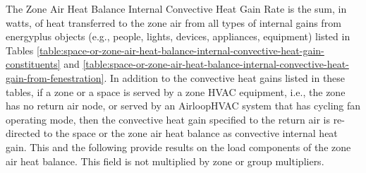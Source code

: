 The Zone Air Heat Balance Internal Convective Heat Gain Rate is the sum, in watts, of heat transferred to the zone air from all types of internal gains from energyplus objects (e.g., people, lights, devices, appliances, equipment) listed in Tables \ref{table:space-or-zone-air-heat-balance-internal-convective-heat-gain-constituents} and \ref{table:space-or-zone-air-heat-balance-internal-convective-heat-gain-from-fenestration}. In addition to the convective heat gains listed in these tables, if a zone or a space is served by a zone HVAC equipment, i.e., the zone has no return air node, or served by an AirloopHVAC system that has cycling fan operating mode, then the convective heat gain specified to the return air is re-directed to the space or the zone air heat balance as convective internal heat gain. This and the following provide results on the load components of the zone air heat balance. This field is not multiplied by zone or group multipliers.

